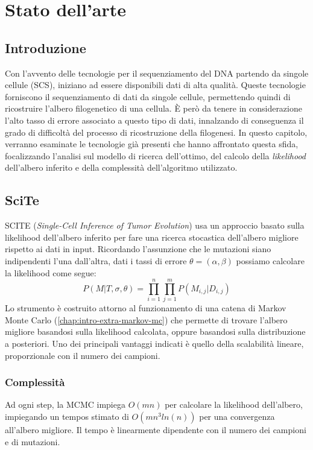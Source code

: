 
\chapter{Stato dell'arte}
\label{chap:art}


\section{Introduzione}
\label{chap:art-intro}
Con l'avvento delle tecnologie per il sequenziamento del DNA partendo da singole cellule (SCS), iniziano ad essere disponibili dati di alta qualità. Queste tecnologie forniscono il sequenziamento di dati da singole cellule, permettendo quindi di ricostruire l'albero filogenetico di una cellula. È però da tenere in considerazione l'alto tasso di errore associato a questo tipo di dati, innalzando di conseguenza il grado di difficoltà del processo di ricostruzione della filogenesi. 
In questo capitolo, verranno esaminate le tecnologie già presenti che hanno affrontato questa sfida, focalizzando l'analisi sul modello di ricerca dell'ottimo, del calcolo della \textit{likelihood} dell'albero inferito e della complessità dell'algoritmo utilizzato.


\section{SciTe \cite{scite}}
\label{chap:art-scite}
SCITE (\textit{Single-Cell Inference of Tumor Evolution}) usa un approccio basato sulla likelihood dell'albero inferito per fare una ricerca stocastica dell'albero migliore rispetto ai dati in input. Ricordando l'assunzione che le mutazioni siano indipendenti l'una dall'altra, dati i tassi di errore $\theta = (\alpha, \beta)$ possiamo calcolare la likelihood come segue:
\begin{equation}
  P(M | T, \sigma, \theta) = \prod_{i = 1}^{n}\prod_{j = 1}^{m} P(M_{i,j} | D_{i,j})
\end{equation}
Lo strumento è costruito attorno al funzionamento di una catena di Markov Monte Carlo (\autoref{chap:intro-extra-markov-mc}) che permette di trovare l'albero migliore basandosi sulla likelihood calcolata, oppure basandosi sulla distribuzione a posteriori. Uno dei principali vantaggi indicati è quello della scalabilità lineare, proporzionale con il numero dei campioni.

\subsection{Complessità}
Ad ogni step, la MCMC impiega $O(mn)$ per calcolare la likelihood dell'albero, impiegando un tempos stimato di $O(mn^3 ln(n))$ per una convergenza all'albero migliore. Il tempo è linearmente dipendente con il numero dei campioni e di mutazioni.

